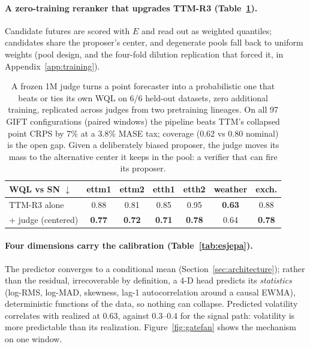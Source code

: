 \paragraph{A zero-training reranker that upgrades TTM-R3
(Table~\ref{tab:hybrid}).}
Candidate futures are scored with $E$ and read out as weighted
quantiles; candidates share the proposer's center, and degenerate pools
fall back to uniform weights (pool design, and the four-fold dilution
replication that forced it, in Appendix~\ref{app:training}).

\begin{table}[t]
\centering
\scriptsize
\begin{tabular}{lcccccc}
\toprule
WQL vs SN $\downarrow$ & ettm1 & ettm2 & etth1 & etth2 & weather & exch. \\
\midrule
TTM-R3 alone & 0.88 & 0.81 & 0.85 & 0.95 & \textbf{0.63} & 0.88 \\
+ judge (centered) & \textbf{0.77} & \textbf{0.72} & \textbf{0.71} & \textbf{0.78} & 0.64 & \textbf{0.78} \\
\bottomrule
\end{tabular}
\caption{A frozen 1M judge turns a point forecaster into a probabilistic
one that beats or ties its own WQL on 6/6 held-out datasets, zero
additional training, replicated across judges from two pretraining
lineages. On all 97 GIFT configurations (paired windows) the pipeline
beats TTM's collapsed point CRPS by 7\% at a 3.8\% MASE tax; coverage
(0.62 vs 0.80 nominal) is the open gap. Given a deliberately biased
proposer, the judge moves its mass to the alternative center it keeps in
the pool: a verifier that can fire its proposer.}
\label{tab:hybrid}
\end{table}

\paragraph{Four dimensions carry the calibration
(Table~\ref{tab:esjepa}).}
\label{sec:esjepa}
The predictor converges to a conditional mean
(Section~\ref{sec:architecture}); rather than the residual, irrecoverable
by definition, a 4-D head predicts its \emph{statistics} (log-RMS,
log-MAD, skewness, lag-1 autocorrelation around a causal EWMA),
deterministic functions of the data, so nothing can collapse. Predicted
volatility correlates with realized at 0.63, against 0.3--0.4 for the
signal path: volatility is more predictable than its realization.
Figure~\ref{fig:gatefan} shows the mechanism on one window.

